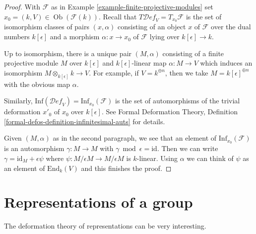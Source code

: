 \documentclass{stacks-project}
\theoremstyle{plain}
\theoremstyle{definition}
\theoremstyle{remark}
\numberwithin{equation}{subsection}
\def\Ob{\mathop{\mathrm{Ob}}\nolimits}
\def\Deformationcategory{\mathcal{D}\!\mathit{ef}}
\begin{document}
\begin{proof}
With $\mathcal{F}$ as in Example \ref{example-finite-projective-modules}
set $x_0 = (k, V) \in \Ob(\mathcal{F}(k))$.
Recall that $T\Deformationcategory_V = T_{x_0}\mathcal{F}$
is the set of isomorphism
classes of pairs $(x, \alpha)$ consisting of an object $x$ of $\mathcal{F}
$ over the dual numbers $k[\epsilon]$ and a morphism
$\alpha : x \to x_0$ of $\mathcal{F}$ lying over $k[\epsilon] \to k$.

\medskip\noindent
Up to isomorphism, there is a unique pair $(M, \alpha)$ consisting of a
finite projective module $M$ over $k[\epsilon]$
and $k[\epsilon]$-linear map $\alpha : M \to V$
which induces an isomorphism $M \otimes_{k[\epsilon]} k \to V$.
For example, if $V = k^{\oplus n}$, then we take
$M = k[\epsilon]^{\oplus n}$ with the obvious map $\alpha$.

\medskip\noindent
Similarly, $\text{Inf}(\Deformationcategory_V) = \text{Inf}_{x_0}(\mathcal{F})$
is the set of automorphisms
of the trivial deformation $x'_0$ of $x_0$ over $k[\epsilon]$.
See Formal Deformation Theory, Definition
\ref{formal-defos-definition-infinitesimal-auts} for details.

\medskip\noindent
Given $(M, \alpha)$ as in the second paragraph, we see that an element of
$\text{Inf}_{x_0}(\mathcal{F})$ is an automorphism $\gamma : M \to M$ with
$\gamma \bmod \epsilon = \text{id}$. Then we can write
$\gamma = \text{id}_M + \epsilon \psi$ where
$\psi : M/\epsilon M \to M/\epsilon M$ is $k$-linear.
Using $\alpha$ we can think of $\psi$ as an element of
$\text{End}_k(V)$ and this finishes the proof.
\end{proof}


\section{Representations of a group}
\label{section-representations}

\noindent
The deformation theory of representations can be very interesting.
\end{document}
